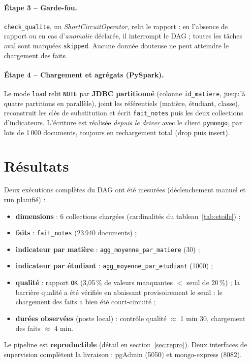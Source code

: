﻿\documentclass[10pt,a4paper]{article}
\begin{document}
\paragraph{Étape 3 -- Garde-fou.} \texttt{check\_qualite}, un \emph{ShortCircuitOperator}, relit le
rapport : en l'absence de rapport ou en cas d'\emph{anomalie} déclarée, il interrompt le DAG ; toutes
les tâches aval sont marquées \texttt{skipped}. Aucune donnée douteuse ne peut atteindre le
chargement des faits.

\paragraph{Étape 4 -- Chargement et agrégats (PySpark).} Le mode \texttt{load} relit \texttt{NOTE}
par \textbf{JDBC partitionné} (colonne \texttt{id\_matiere}, jusqu'à quatre partitions en
parallèle), joint les référentiels (matière, étudiant, classe), reconstruit les clés de substitution
et écrit \texttt{fait\_notes} puis les deux collections d'indicateurs. L'écriture est réalisée
\emph{depuis le driver} avec le client \texttt{pymongo}, par lots de 1\,000 documents, toujours en
rechargement total (drop puis insert).

\section{Résultats}\label{sec:resultats}
Deux exécutions complètes du DAG ont été mesurées (déclenchement manuel et run planifié) :
\begin{itemize}
  \item \textbf{dimensions} : 6 collections chargées (cardinalités du tableau~\ref{tab:etoile}) ;
  \item \textbf{faits} : \texttt{fait\_notes} (23\,940 documents) ;
  \item \textbf{indicateur par matière} : \texttt{agg\_moyenne\_par\_matiere} (30) ;
  \item \textbf{indicateur par étudiant} : \texttt{agg\_moyenne\_par\_etudiant} (1000) ;
  \item \textbf{qualité} : rapport \texttt{OK} (3{,}05\,\% de valeurs manquantes $<$ seuil de
        20\,\%) ; la barrière qualité a été vérifiée en abaissant provisoirement le seuil : le
        chargement des faits a bien été court-circuité ;
  \item \textbf{durées observées} (poste local) : contrôle qualité $\approx$ 1 min 30,
        chargement des faits $\approx$ 4 min.
\end{itemize}
Le pipeline est \textbf{reproductible} (détail en section~\ref{sec:repro}). Deux interfaces de
supervision complètent la livraison : pgAdmin (5050) et mongo-express (8082).
\end{document}
